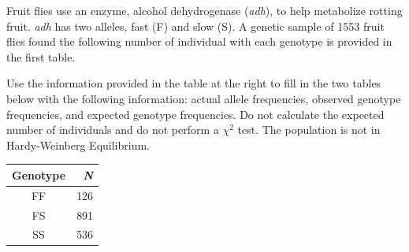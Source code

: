 
\question[15]
Fruit flies use an enzyme, alcohol dehydrogenase (\emph{adh}), to help metabolize rotting fruit. \emph{adh} has two alleles, fast (F) and slow (S).  A genetic sample of 1553 fruit flies found the following number of individual with each genotype is provided in the first table.

\vspace{\baselineskip}

\begin{minipage}{0.6\linewidth}
Use the information provided in the table at the right to fill in the two tables below with the following information: actual allele frequencies, observed genotype frequencies, and expected genotype frequencies.  Do not calculate the expected number of individuals and do not perform a $\chi^2$ test. The population is not in Hardy-Weinberg Equilibrium.
\end{minipage}\hfill
\begin{minipage}{0.3\linewidth}
	\begin{tabular}{cr}
	\toprule
	Genotype	&	\emph{N}\\
	\midrule
	FF	&	126\\
	FS	&	891\\
	SS	&	536\\
	\bottomrule
	\end{tabular}\vfill
\end{minipage}

\vspace{\baselineskip}

